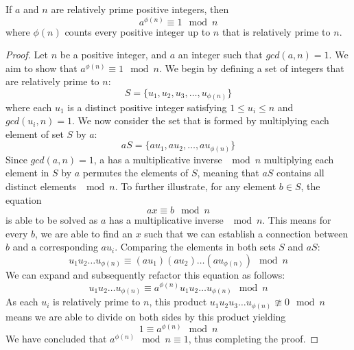 \documentclass{article}
\begin{document}
\begin{tcolorbox}[colback=orange!5!white, colframe=orange!50!white, title=\textbf{Theorem 2.1 (Euler)}]
If $a$ and $n$ are relatively prime positive integers, then 
\begin{equation}
a^{\phi(n)} \equiv 1 \mod n
\end{equation}
where $\phi(n)$ counts every positive integer up to $n$ that is relatively prime to $n$. 
\end{tcolorbox}
\begin{proof}
    Let $n$ be a positive integer, and $a$ an integer such that $gcd(a, n) = 1$. We aim to show that $a^{\phi(n)} \equiv 1 \mod n$. We begin by defining a set of integers that are relatively prime to $n$: 
\begin{equation}
S = \{ u_1, u_2, u_3, \ldots, u_{\phi(n)} \}
\end{equation}
where each $u_1$ is a distinct positive integer satisfying $1 \leq u_i \leq n$ and $gcd(u_i, n) = 1$. We now consider the set that is formed by multiplying each element of set $S$ by $a$:
\begin{equation}
aS = \{ au_1, au_2, \ldots, au_{\phi(n)} \}
\end{equation}
Since $gcd(a, n) = 1$, a has a multiplicative inverse $\mod n$ multiplying each element in $S$ by $a$ permutes the elements of $S$, meaning that $aS$ contains all distinct elements $\mod n$. To further illustrate, for any element $b \in S$, the equation
\begin{equation}
ax \equiv b \mod n
\end{equation}
is able to be solved as $a$ has a multiplicative inverse $\mod n$. This means for every $b$, we are able to find an $x$ such that we can establish a connection between $b$ and a corresponding $au_i$. Comparing the elements in both sets $S$ and $aS$:
\begin{equation}
u_1u_2 \ldots u_{\phi(n)} \equiv (au_1)(au_2) \ldots (au_{\phi(n)}) \mod n
\end{equation}
We can expand and subsequently refactor this equation as follows:
\begin{equation}
u_1u_2 \ldots u_{\phi(n)} \equiv a^{\phi(n)}u_1u_2 \ldots u_{\phi(n)} \mod n
\end{equation}
As each $u_i$ is relatively prime to $n$, this product $u_1u_2u_3 \ldots u_{\phi(n)} \ncong 0 \mod n$ means we are able to divide on both sides by this product yielding
\begin{equation}
1 \equiv a^{\phi(n)} \mod n
\end{equation}
We have concluded that $ a^{\phi(n)} \mod n \equiv 1$, thus completing the proof.
\end{proof}
\end{document}

